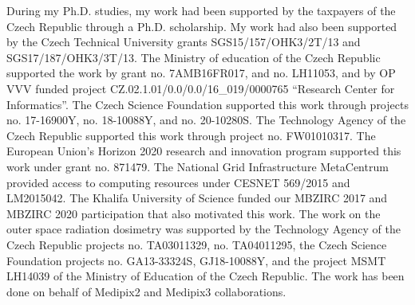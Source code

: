 During my Ph.D. studies, my work had been supported by the taxpayers of the Czech Republic through a Ph.D. scholarship.
My work had also been supported by the Czech Technical University grants SGS15/157/OHK3/2T/13 and SGS17/187/OHK3/3T/13.
The Ministry of education of the Czech Republic supported the work by grant no. 7AMB16FR017, and no. LH11053, and by OP VVV funded project CZ.02.1.01/0.0/0.0/16\_019/0000765 ``Research Center for Informatics''.
The Czech Science Foundation supported this work through projects no. 17-16900Y, no. 18-10088Y, and no. 20-10280S.
The Technology Agency of the Czech Republic supported this work through project no. FW01010317.
The European Union's Horizon 2020 research and innovation program supported this work under grant no. 871479.
The National Grid Infrastructure MetaCentrum provided access to computing resources under CESNET 569/2015 and LM2015042.
The Khalifa University of Science funded our MBZIRC 2017 and MBZIRC 2020 participation that also motivated this work.
The work on the outer space radiation dosimetry was supported by the Technology Agency of the Czech Republic projects no. TA03011329, no. TA04011295, the Czech Science Foundation projects no. GA13-33324S, GJ18-10088Y, and the project MSMT LH14039 of the Ministry of Education of the Czech Republic.
The work has been done on behalf of Medipix2 and Medipix3 collaborations.

\vspace{2.5cm}
